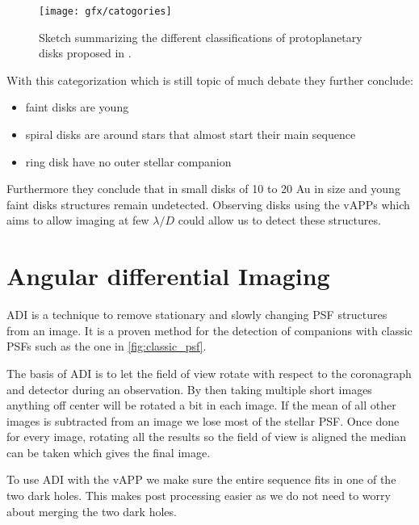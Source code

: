 \begin{figure}[H]
    \caption{Sketch summarizing the different classifications of protoplanetary disks proposed in \cite{garufi}.}
    \centering
    \texttt{[image: gfx/catogories]}
    \label{fig:sketch_garufi}
\end{figure}

With this categorization which is still topic of much debate they \cite{garufi} further conclude:
\begin{itemize}
    \item faint disks are young
    \item spiral disks are around stars that almost start their main sequence
    \item ring disk have no outer stellar companion %
\end{itemize}

Furthermore they \cite{garufi} conclude that in small disks of 10 to 20 Au in size and young faint disks structures remain undetected. Observing disks using the \acp{vAPP} which aims to allow imaging at few $\lambda/D$ could allow us to detect these structures.

\section{Angular differential Imaging}
\label{sec:adi}
\ac{ADI} \cite{marois_2005} is a technique to remove stationary and slowly changing PSF structures from an image. It is a proven method for the detection of companions with classic \acp{PSF} such as the one in \autoref{fig:classic_psf}. %

The basis of \ac{ADI} is to let the field of view rotate with respect to the coronagraph and detector during an observation. By then taking multiple short images anything off center will be rotated a bit in each image. If the mean of all other images is subtracted from an image we lose most of the stellar \ac{PSF}. Once done for every image, rotating all the results so the field of view is aligned the median can be taken which gives the final image.

To use \ac{ADI} with the \ac{vAPP} we make sure the entire sequence fits in one of the two dark holes. This makes post processing easier as we do not need to worry about merging the two dark holes.
